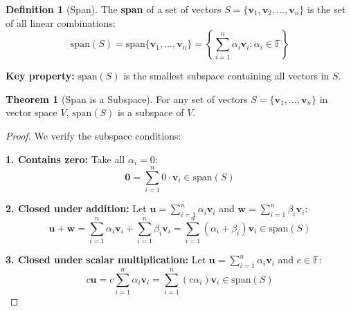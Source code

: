 \documentclass[12pt,a4paper]{article}
\theoremstyle{definition}
\newtheorem{definition}{Definition}[section]
\newtheorem{theorem}{Theorem}[section]
\begin{document}
\begin{definition}[Span]
The \textbf{span} of a set of vectors $S = \{\mathbf{v}_1, \mathbf{v}_2, \ldots, \mathbf{v}_n\}$ is the set of all linear combinations:
\begin{equation}
\text{span}(S) = \text{span}\{\mathbf{v}_1, \ldots, \mathbf{v}_n\} = \left\{\sum_{i=1}^n \alpha_i\mathbf{v}_i : \alpha_i \in \mathbb{F}\right\}
\end{equation}

\textbf{Key property:} $\text{span}(S)$ is the smallest subspace containing all vectors in $S$.
\end{definition}

\begin{theorem}[Span is a Subspace]
For any set of vectors $S = \{\mathbf{v}_1, \ldots, \mathbf{v}_n\}$ in vector space $V$, $\text{span}(S)$ is a subspace of $V$.
\end{theorem}

\begin{proof}
We verify the subspace conditions:

\textbf{1. Contains zero:} Take all $\alpha_i = 0$:
\begin{equation}
\mathbf{0} = \sum_{i=1}^n 0 \cdot \mathbf{v}_i \in \text{span}(S)
\end{equation}

\textbf{2. Closed under addition:} Let $\mathbf{u} = \sum_{i=1}^n \alpha_i\mathbf{v}_i$ and $\mathbf{w} = \sum_{i=1}^n \beta_i\mathbf{v}_i$:
\begin{equation}
\mathbf{u} + \mathbf{w} = \sum_{i=1}^n \alpha_i\mathbf{v}_i + \sum_{i=1}^n \beta_i\mathbf{v}_i = \sum_{i=1}^n (\alpha_i + \beta_i)\mathbf{v}_i \in \text{span}(S)
\end{equation}

\textbf{3. Closed under scalar multiplication:} Let $\mathbf{u} = \sum_{i=1}^n \alpha_i\mathbf{v}_i$ and $c \in \mathbb{F}$:
\begin{equation}
c\mathbf{u} = c\sum_{i=1}^n \alpha_i\mathbf{v}_i = \sum_{i=1}^n (c\alpha_i)\mathbf{v}_i \in \text{span}(S)
\end{equation}
\end{proof}
\end{document}

